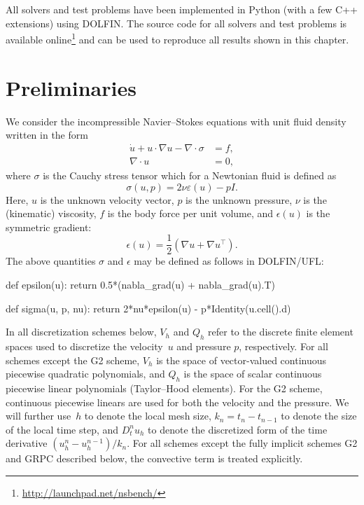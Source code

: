 All solvers and test problems have been implemented in Python (with a
few C++ extensions) using DOLFIN. The source code for all solvers and
test problems is available
online\footnote{\url{http://launchpad.net/nsbench/}} and can be used
to reproduce all results shown in this chapter.

\vspace*{3pt}
\section{Preliminaries}

We consider the incompressible Navier--Stokes equations with unit
fluid density written in the form\vspace*{2pt}
\begin{align}
  \label{eq:ns,mom}
  \dot{u} + u \cdot \nabla u - \nabla \cdot \sigma &= f, \\
  \label{eq:ns,con}
  \nabla \cdot u &= 0,
\end{align}\vspace*{2pt}
where $\sigma$ is the Cauchy stress tensor which for a Newtonian fluid
is defined as\vspace*{2pt}
\begin{equation}
  \sigma(u,p) = 2\nu\varepsilon(u) - pI.
\end{equation}
Here, $u$ is the unknown velocity vector, $p$ is the unknown pressure,
$\nu$ is the (kinematic) viscosity, $f$ is the body force per unit
volume, and $\epsilon(u)$ is the symmetric gradient:
\begin{equation}
  \epsilon(u) = \frac{1}{2} (\nabla u + \nabla u^{\top}).
\end{equation}
The above quantities $\sigma$ and $\epsilon$ may be defined as follows
in DOLFIN/UFL:
\begin{python}
def epsilon(u):
    return 0.5*(nabla_grad(u) + nabla_grad(u).T)
\end{python}
\begin{python}
def sigma(u, p, nu):
    return 2*nu*epsilon(u) - p*Identity(u.cell().d)
\end{python}

In all discretization schemes below, $V_h$ and $Q_h$ refer to the
discrete finite element spaces used to discretize the velocity~$u$ and
pressure $p$, respectively. For all schemes except the G2 scheme,
$V_h$ is the space of vector-valued continuous piecewise quadratic
polynomials, and $Q_h$ is the space of scalar continuous piecewise
linear polynomials (Taylor--Hood elements). For the G2 scheme,
continuous piecewise linears are used for both the velocity and the
pressure. We will further use~$h$ to denote the local mesh size, $k_n
= t_n - t_{n-1}$ to denote the size of the local time step, and $D^n_t
u_h$ to denote the discretized form of the time derivative $(u_h^n -
u_h^{n-1})/k_n$. For all schemes except the fully implicit schemes G2
and GRPC described below, the convective term is treated explicitly.

